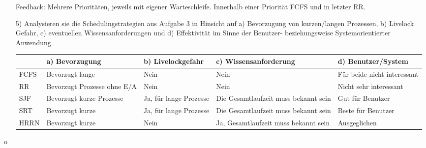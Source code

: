 \documentclass[11pt,a4paper]{article}
\begin{document}
\begin{itemize}
Feedback: Mehrere Prioritäten, jeweils mit eigener Warteschleife. Innerhalb einer Priorität FCFS und in letzter RR.


\pagebreak


\item[5)] Analysieren sie die Schedulingstrategien aus Aufgabe 3 in Hinsicht auf a) Bevorzugung von kurzen/langen Prozessen, b) Livelock Gefahr, c) eventuellen Wissensanforderungen und d) Effektivität im Sinne der Benutzer- beziehungsweise Systemorientierter Anwendung.\\

\begin{tabular}{|p{1.2cm} ||p{3cm}|p{3cm}|p{3cm}|p{3.6cm}|}
\hline 
 & a) Bevorzugung & b) Livelockgefahr & c) Wissensanforderung & d) Benutzer/System\\ 
\hline
\hline 
FCFS & Bevorzugt lange & Nein & Nein & Für beide nicht interessant \\ 
\hline 
RR & Bevorzugt Prozesse ohne E/A & Nein & Nein & Nicht sehr interessant \\ 
\hline 
SJF & Bevorzugt kurze Prozesse & Ja, für lange Prozesse & Die Gesamtlaufzeit muss bekannt sein & Gut für Benutzer \\ 
\hline 
SRT & Bevorzugt kurze & Ja, für lange Prozesse & Die Gesamtlaufzeit muss bekannt sein & Beste für Benutzer \\ 
\hline 
HRRN & Bevorzugt kurze & Nein & Ja, Gesamtlaufzeit muss bekannt sein & Ausgeglichen \\ 
\hline 
\end{tabular} 
\end{itemize}
o
\end{document}
